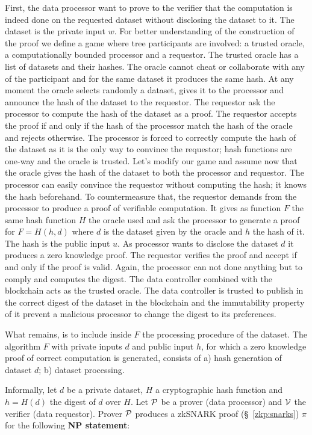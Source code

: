 First, the data processor want to prove to the verifier that the computation is indeed done on the requested dataset without disclosing the dataset to it. The dataset is the private input $w$. For better understanding of the construction of the proof we define a game where tree participants are involved: a trusted oracle, a  computationally bounded processor and a requestor. The trusted oracle has a list of datasets and their hashes. The oracle cannot cheat or collaborate with any of the participant and for the same dataset it produces the same hash. At any moment the oracle selects randomly a dataset, gives it to the processor and announce the hash of the dataset to the requestor. The requestor ask the processor to compute the hash of the dataset as a proof. The requestor accepts the proof if and only if the hash of the processor match the hash of the oracle and rejects otherwise. The processor is forced to correctly compute the hash of the dataset as it is the only way to convince the requestor; hash functions are one-way and the oracle is trusted. Let's modify our game and assume now that the oracle gives the hash of the dataset to both the processor and requestor. The processor can easily convince the requestor without computing the hash; it knows the hash beforehand. To countermeasure that, the requestor demands from the processor to produce a proof of verifiable computation. It gives as function $F$ the same hash function $H$ the oracle used and ask the processor to generate a proof for $F = H(h, d)$ where $d$ is the dataset given by the oracle and $h$ the hash of it. The hash is the public input $u$. As processor wants to disclose the dataset $d$ it produces a zero knowledge proof. The requestor verifies the proof and accept if and only if the proof is valid. Again, the processor can not done anything but to comply and computes the digest. The data controller combined with the blockchain acts as the trusted oracle. The data controller is trusted to publish in the correct digest of the dataset in the blockchain and the immutability property of it prevent a malicious processor to change the digest to its preferences.

What remains, is to include inside $F$ the processing procedure of the dataset. The algorithm $F$ with private inputs $d$ and public input $h$, for which a zero knowledge proof of correct computation is generated, consists of a) hash generation of dataset $d$; b) dataset processing.

Informally, let $d$ be a private dataset, $H$ a cryptographic hash function and $h = H(d)$ the digest of $d$ over $H$. Let $\mathcal{P}$ be a prover (data processor) and $\mathcal{V}$ the verifier (data requestor). Prover $\mathcal{P}$ produces a zkSNARK proof (§~\ref{zkp:snarks}) $\pi$ for the following \textbf{NP statement}:

